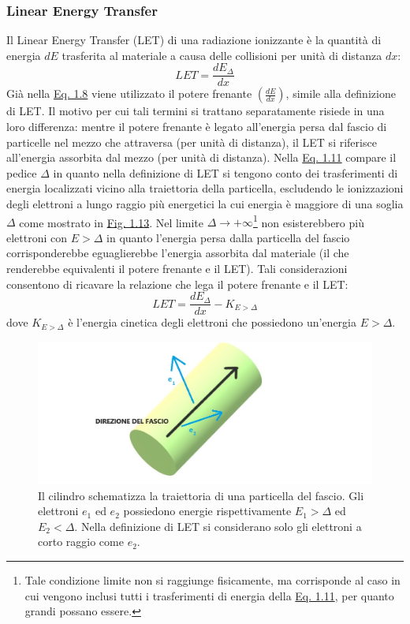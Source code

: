 \documentclass[12pt,a4paper,twoside]{report}
\begin{document}
	\subsubsection{Linear Energy Transfer}\label{par:let}
	Il Linear Energy Transfer (LET) di una radiazione ionizzante è la quantità di energia $dE$ trasferita al materiale a causa delle collisioni per unità di distanza $dx$:
	\begin{equation}
		LET=\frac{dE_\Delta}{dx}
		\label{eq:let}
	\end{equation}
	Già nella \hyperref[eq:dose_as]{Eq. 1.8} viene utilizzato il potere frenante $\left(\frac{dE}{dx}\right)$, simile alla definizione di LET. Il motivo per cui tali termini si trattano separatamente risiede in una loro differenza: mentre il potere frenante è legato all'energia persa dal fascio di particelle nel mezzo che attraversa (per unità di distanza), il LET si riferisce all'energia assorbita dal mezzo (per unità di distanza). Nella \hyperref[eq:let]{Eq. 1.11} compare il pedice $\Delta$ in quanto nella definizione di LET si tengono conto dei trasferimenti di energia localizzati vicino alla traiettoria della particella, escludendo le ionizzazioni degli elettroni a lungo raggio più energetici la cui energia è maggiore di una soglia $\Delta$ come mostrato in \hyperref[fig:let]{Fig. 1.13}. Nel limite $\Delta\rightarrow+\infty$\footnote{Tale condizione limite non si raggiunge fisicamente, ma corrisponde al caso in cui vengono inclusi tutti i trasferimenti di energia della \hyperref[eq:let]{Eq. 1.11}, per quanto grandi possano essere.} non esisterebbero più elettroni con $E>\Delta$ in quanto l'energia persa dalla particella del fascio corrisponderebbe eguaglierebbe l'energia assorbita dal materiale (il che renderebbe equivalenti il potere frenante e il LET). Tali considerazioni consentono di ricavare la relazione che lega il potere frenante e il LET:
	\begin{equation}
		LET=\frac{dE_\Delta}{dx}-K_{E>\Delta}
		\label{eq:let&stoppingpower}
	\end{equation}
	dove $K_{E>\Delta}$ è l'energia cinetica degli elettroni che possiedono un'energia $E>\Delta$.
	
	\begin{figure}[H]
		\centering
		\includegraphics[width=0.9\linewidth]{images/let.jpg}
		\caption{Il cilindro schematizza la traiettoria di una particella del fascio. Gli elettroni $e_1$ ed $e_2$ possiedono energie rispettivamente $E_1>\Delta$ ed $E_2<\Delta$. Nella definizione di LET si considerano solo gli elettroni a corto raggio come $e_2$.}
		\label{fig:let}
	\end{figure}
	
\end{document}
